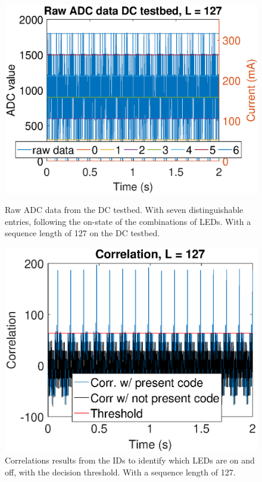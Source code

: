 \begin{figure}[t]
  \centering
  \begin{minipage}[b]{0.49\textwidth}
    \includegraphics[width=\textwidth]{chapters/evaluation-chapters/hardware/dc/raw-dc-testbed-adc-data-n=7.eps}
    \caption{Raw ADC data from the DC testbed. With seven distinguishable entries, following the on-state of the combinations of LEDs. With a sequence length of 127  on the DC testbed.}
  \label{fig:raw-dc-testbed-adc-data-n=7}
  \end{minipage}
  \hfill
  \begin{minipage}[b]{0.49\textwidth}
    \includegraphics[width=\textwidth]{chapters/evaluation-chapters/hardware/dc/correlation-dc-testbed-n=7.eps}
    \caption{Correlations results from the IDs to identify which LEDs are on and off, with the decision threshold. With a sequence length of 127.}
  \label{fig:correlation-dc-testbed-n=7}
  \end{minipage}
\end{figure}



